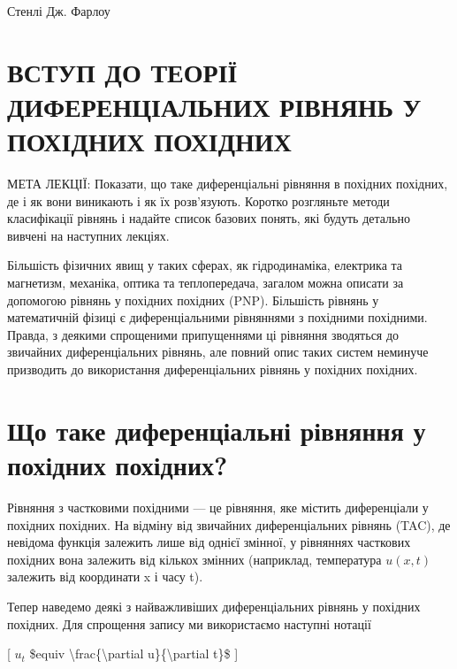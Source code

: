 \documentclass[
]{article}
\begin{document}
Стенлі Дж. Фарлоу

\section{ВСТУП ДО ТЕОРІЇ ДИФЕРЕНЦІАЛЬНИХ РІВНЯНЬ У ПОХІДНИХ
ПОХІДНИХ}\label{ux432ux441ux442ux443ux43f-ux434ux43e-ux442ux435ux43eux440ux456ux457-ux434ux438ux444ux435ux440ux435ux43dux446ux456ux430ux43bux44cux43dux438ux445-ux440ux456ux432ux43dux44fux43dux44c-ux443-ux43fux43eux445ux456ux434ux43dux438ux445-ux43fux43eux445ux456ux434ux43dux438ux445}

МЕТА ЛЕКЦІЇ: Показати, що таке диференціальні рівняння в похідних
похідних, де і як вони виникають і як їх розв'язують. Коротко розгляньте
методи класифікації рівнянь і надайте список базових понять, які будуть
детально вивчені на наступних лекціях.

Більшість фізичних явищ у таких сферах, як гідродинаміка, електрика та
магнетизм, механіка, оптика та теплопередача, загалом можна описати за
допомогою рівнянь у похідних похідних (PNP). Більшість рівнянь у
математичній фізиці є диференціальними рівняннями з похідними похідними.
Правда, з деякими спрощеними припущеннями ці рівняння зводяться до
звичайних диференціальних рівнянь, але повний опис таких систем неминуче
призводить до використання диференціальних рівнянь у похідних похідних.

\section{Що таке диференціальні рівняння у похідних
похідних?}\label{ux449ux43e-ux442ux430ux43aux435-ux434ux438ux444ux435ux440ux435ux43dux446ux456ux430ux43bux44cux43dux456-ux440ux456ux432ux43dux44fux43dux43dux44f-ux443-ux43fux43eux445ux456ux434ux43dux438ux445-ux43fux43eux445ux456ux434ux43dux438ux445}

Рівняння з частковими похідними --- це рівняння, яке містить
диференціали у похідних похідних. На відміну від звичайних
диференціальних рівнянь (TAC), де невідома функція залежить лише від
однієї змінної, у рівняннях часткових похідних вона залежить від кількох
змінних (наприклад, температура \(u(x, t)\) залежить від координати x і
часу t).

Тепер наведемо деякі з найважливіших диференціальних рівнянь у похідних
похідних. Для спрощення запису ми використаємо наступні нотації

{[} \(u_t\) \$equiv \textbackslash frac\{\textbackslash partial
u\}\{\textbackslash partial t\}\$ {]}
\end{document}

